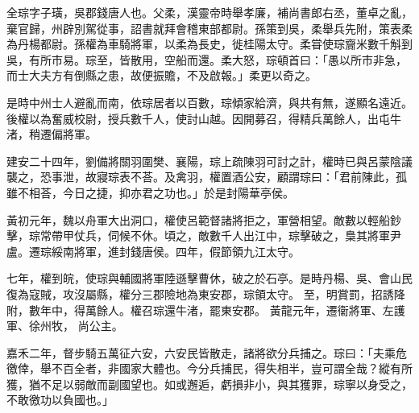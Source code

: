 \begin{pinyinscope}
 
 
 全琮字子璜，吳郡錢唐人也。父柔，漢靈帝時舉孝廉，補尚書郎右丞，董卓之亂，棄官歸，州辟別駕從事，詔書就拜會稽東部都尉。孫策到吳，柔舉兵先附，策表柔為丹楊都尉。孫權為車騎將軍，以柔為長史，徙桂陽太守。柔甞使琮齎米數千斛到吳，有所市易。琮至，皆散用，空船而還。柔大怒，琮頓首曰：「愚以所市非急，而士大夫方有倒縣之患，故便振贍，不及啟報。」柔更以奇之。
 
 
 是時中州士人避亂而南，依琮居者以百數，琮傾家給濟，與共有無，遂顯名遠近。後權以為奮威校尉，授兵數千人，使討山越。因開募召，得精兵萬餘人，出屯牛渚，稍遷偏將軍。
 
 
 
 
 建安二十四年，劉備將關羽圍樊、襄陽，琮上疏陳羽可討之計，權時已與呂蒙陰議襲之，恐事泄，故寢琮表不荅。及禽羽，權置酒公安，顧謂琮曰：「君前陳此，孤雖不相荅，今日之捷，抑亦君之功也。」於是封陽華亭侯。
 
 
 
 
 黃初元年，魏以舟軍大出洞口，權使呂範督諸將拒之，軍營相望。敵數以輕船鈔擊，琮常帶甲仗兵，伺候不休。頃之，敵數千人出江中，琮擊破之，梟其將軍尹盧。遷琮綏南將軍，進封錢唐侯。四年，假節領九江太守。
 
 
七年，權到皖，使琮與輔國將軍陸遜擊曹休，破之於石亭。是時丹楊、吳、會山民復為寇賊，攻沒屬縣，權分三郡險地為東安郡，琮領太守。
 至，明賞罰，招誘降附，數年中，得萬餘人。權召琮還牛渚，罷東安郡。
 黃龍元年，遷衞將軍、左護軍、徐州牧，
 尚公主。
 
 
 
 
 嘉禾二年，督步騎五萬征六安，六安民皆散走，諸將欲分兵捕之。琮曰：「夫乘危徼倖，舉不百全者，非國家大體也。今分兵捕民，得失相半，豈可謂全哉？縱有所獲，猶不足以弱敵而副國望也。如或邂逅，虧損非小，與其獲罪，琮寧以身受之，不敢徼功以負國也。」
 
 
 

\end{pinyinscope}
